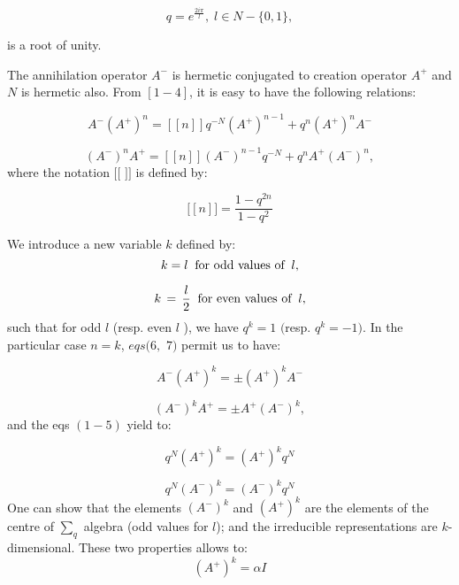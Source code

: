 \documentclass[a4paper,12pt,thmsa]{article}
\begin{document}
\begin{equation}
q=e^{\frac{2i\pi }l},\; l\in N-\{0,1\},
\end{equation}

is a root of unity.

The annihilation operator $A^{-}$ is hermetic conjugated to creation
operator $A^{+}$ and $N$ is hermetic also. From $\left[ 1-4\right] $, it is
easy to have the following relations:

\begin{equation}
A^{-}(A^{+})^n=[[n]]q^{-N}(A^{+})^{n-1}+q^n(A^{+})^nA^{-}
\end{equation}

\begin{equation}
(A^{-})^nA^{+}=[[n]](A^{-})^{n-1}q^{-N}+q^nA^{+}(A^{-})^n,
\end{equation}
where the notation $[[$ $]]$ is defined by:

\begin{equation}
\lbrack [n]]=\frac{1-q^{2n}}{1-q^2}
\end{equation}

We introduce a new variable $k$ defined by:
\begin{equation}
k=l\;\; \hbox{for  odd  values  of}\;\; l,
\end{equation}

\begin{equation}
k\, =\, \frac l2\;\; \hbox{for even values of}\;\; l,
\end{equation}
such that for odd $l$ (resp. even $l$ ), we have $q^k=1$ $($resp. $q^k=-1).$
In the particular case $n=k$, $eqs(6,$ $7)$ permit us to have:

\begin{equation}
A^{-}(A^{+})^k=\pm (A^{+})^kA^{-}
\end{equation}

\begin{equation}
(A^{-})^kA^{+}=\pm A^{+}(A^{-})^k,
\end{equation}
and the eqs $(1-5)$ yield to:

\begin{equation}
q^N(A^{+})^k=(A^{+})^kq^N
\end{equation}

\begin{equation}
q^N(A^{-})^k=(A^{-})^kq^N
\end{equation}
One can show that the elements $(A^{-})^k$ and $(A^{+})^k$ are the elements
of the centre of $\sum_q$ algebra (odd values for $l$); and the irreducible
representations are $k$-dimensional. These two properties allows to:
\begin{equation}
(A^{+})^k=\alpha I
\end{equation}
\end{document}
